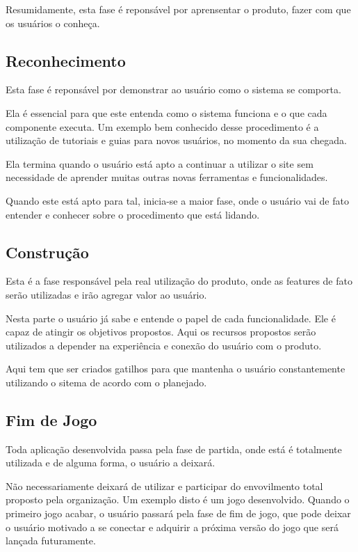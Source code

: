 Resumidamente, esta fase é reponsável por aprensentar o produto, fazer
com que os usuários o conheça.

\subsection{Reconhecimento}
\label{sub:reconhecimento}
Esta fase é reponsável por demonstrar ao usuário como o sistema se comporta.

Ela é essencial para que este entenda como o sistema funciona e o que cada
componente executa. Um exemplo bem conhecido desse procedimento é a utilização
de tutoriais e guias para novos usuários, no momento da sua chegada.

Ela termina quando o usuário está apto a continuar a utilizar o site sem
necessidade de aprender muitas outras novas ferramentas e funcionalidades.

Quando este está apto para tal, inicia-se a maior fase, onde o usuário
vai de fato entender e conhecer sobre o procedimento que está lidando.

\subsection{Construção}
\label{sub:constru_o}
Esta é a fase responsável pela real utilização do produto, onde as features
de fato serão utilizadas e irão agregar valor ao usuário.

Nesta parte o usuário já sabe e entende o papel de cada funcionalidade. Ele é capaz
de atingir os objetivos propostos. Aqui os recursos propostos serão utilizados
a depender na experiência e conexão do usuário com o produto.

Aqui tem que ser criados gatilhos para que mantenha o usuário constantemente utilizando
o sitema de acordo com o planejado.

\subsection{Fim de Jogo}
\label{sub:fim_de_jogo}
Toda aplicação desenvolvida passa pela fase de partida, onde está é totalmente utilizada
e de alguma forma, o usuário a deixará. 

Não necessariamente deixará de utilizar e participar do envovilmento total proposto pela
organização. Um exemplo disto é um jogo desenvolvido. Quando o primeiro jogo acabar, o
usuário passará pela fase de fim de jogo, que pode deixar o usuário motivado a se conectar
e adquirir a próxima versão do jogo que será lançada futuramente.

